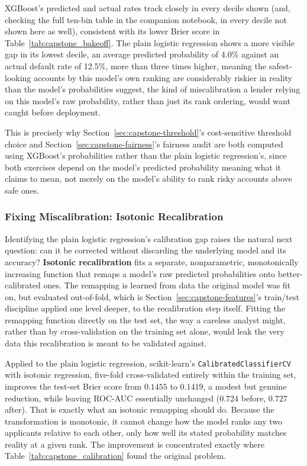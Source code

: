 \documentclass[../ai_in_finance]{subfiles}
\begin{document}
XGBoost's predicted and actual rates track closely in every decile shown (and, checking the full ten-bin table in the companion notebook, in every decile not shown here as well), consistent with its lower Brier score in Table~\ref{tab:capstone_bakeoff}. The plain logistic regression shows a more visible gap in its lowest decile, an average predicted probability of 4.0\% against an actual default rate of 12.5\%, more than three times higher, meaning the safest-looking accounts by this model's own ranking are considerably riskier in reality than the model's probabilities suggest, the kind of miscalibration a lender relying on this model's raw probability, rather than just its rank ordering, would want caught before deployment.

This is precisely why Section~\ref{sec:capstone-threshold}'s cost-sensitive threshold choice and Section~\ref{sec:capstone-fairness}'s fairness audit are both computed using XGBoost's probabilities rather than the plain logistic regression's, since both exercises depend on the model's predicted probability meaning what it claims to mean, not merely on the model's ability to rank risky accounts above safe ones.

\subsubsection*{Fixing Miscalibration: Isotonic Recalibration}

Identifying the plain logistic regression's calibration gap raises the natural next question: can it be corrected without discarding the underlying model and its accuracy? \textbf{Isotonic recalibration} fits a separate, nonparametric, monotonically increasing function that remaps a model's raw predicted probabilities onto better-calibrated ones. The remapping is learned from data the original model was fit on, but evaluated out-of-fold, which is Section~\ref{sec:capstone-features}'s train/test discipline applied one level deeper, to the recalibration step itself. Fitting the remapping function directly on the test set, the way a careless analyst might, rather than by cross-validation on the training set alone, would leak the very data this recalibration is meant to be validated against.

Applied to the plain logistic regression, scikit-learn's \texttt{CalibratedClassifierCV} with isotonic regression, five-fold cross-validated entirely within the training set, improves the test-set Brier score from $0.1455$ to $0.1419$, a modest but genuine reduction, while leaving ROC-AUC essentially unchanged ($0.724$ before, $0.727$ after). That is exactly what an isotonic remapping should do. Because the transformation is monotonic, it cannot change how the model ranks any two applicants relative to each other, only how well its stated probability matches reality at a given rank. The improvement is concentrated exactly where Table~\ref{tab:capstone_calibration} found the original problem.
\end{document}
